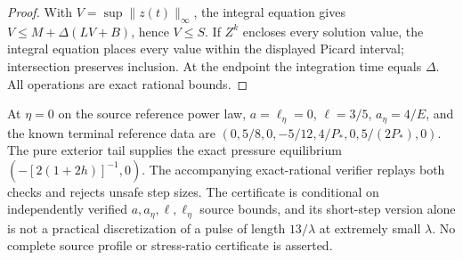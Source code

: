 \begin{proof}
With $V=\sup\|z(t)\|_\infty$, the integral equation gives
$V\le M+\Delta(LV+B)$, hence $V\le S$.
If $Z^k$ encloses every solution value, the integral equation
places every value within the displayed Picard interval; intersection
preserves inclusion. At the endpoint the integration time equals
$\Delta$. All operations are exact rational bounds.
\end{proof}
At $\eta=0$ on the source reference power law,
$a=\ell_\eta=0$, $\ell=3/5$,
$a_\eta=4/E$, and the known terminal reference data are
$(0,5/8,0,-5/12,4/P_*,0,5/(2P_*),0)$.
The pure exterior tail supplies the exact pressure equilibrium
$(-[2(1+2h)]^{-1},0)$.
The accompanying exact-rational verifier replays both checks and
rejects unsafe step sizes.
The certificate is conditional on independently verified
$a,a_\eta,\ell,\ell_\eta$ source bounds, and its short-step version
alone is not a practical discretization of a pulse of length
$13/\lambda$ at extremely small $\lambda$. No complete source
profile or stress-ratio certificate is asserted.
